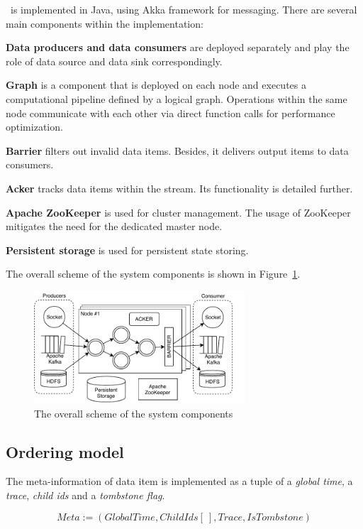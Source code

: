 \label{fs-impl}

\FlameStream\ is implemented in Java, using Akka framework for messaging. There are several main components within the implementation:

{\bf Data producers and data consumers} are deployed separately and play the role of data source and data sink correspondingly.

{\bf Graph} is a component that is deployed on each node and executes a computational pipeline defined by a logical graph. Operations within the same node communicate with each other via direct function calls for performance optimization.

{\bf Barrier} filters out invalid data items. Besides, it delivers output items to data consumers.

{\bf Acker} tracks data items within the stream. Its functionality is detailed further.

{\bf Apache ZooKeeper} is used for cluster management. The usage of ZooKeeper mitigates the need for the dedicated master node.

{\bf Persistent storage} is used for persistent state storing.

The overall scheme of the system components is shown in Figure~\ref{system-architecture}.

\begin{figure}[ht]
  \centering
  \includegraphics[width=0.70\textwidth]{pics/arch}
  \caption{The overall scheme of the system components}
  \label {system-architecture}
\end{figure}

\subsection{Ordering model}
The meta-information of data item is implemented as a tuple of a {\it global time}, a {\it trace}, {\it child ids} and a {\it tombstone flag}.

\[Meta := (GlobalTime, ChildIds[\:], Trace, IsTombstone)\]

